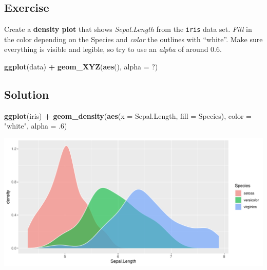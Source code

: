\documentclass[
]{book}
\newenvironment{Shaded}{\begin{snugshade}}{\end{snugshade}}
\newcommand{\AttributeTok}[1]{\textcolor[rgb]{0.13,0.29,0.53}{#1}}
\newcommand{\DecValTok}[1]{\textcolor[rgb]{0.00,0.00,0.81}{#1}}
\newcommand{\FunctionTok}[1]{\textcolor[rgb]{0.13,0.29,0.53}{\textbf{#1}}}
\newcommand{\NormalTok}[1]{#1}
\newcommand{\SpecialCharTok}[1]{\textcolor[rgb]{0.81,0.36,0.00}{\textbf{#1}}}
\newcommand{\StringTok}[1]{\textcolor[rgb]{0.31,0.60,0.02}{#1}}
\begin{document}
\subsection{Exercise}\label{exercise-1}

Create a \textbf{density plot} that shows \emph{Sepal.Length} from the \texttt{iris} data set.
\emph{Fill} in the color depending on the Species and \emph{color} the outlines with ``white''.
Make sure everything is visible and legible, so try to use an \emph{alpha} of around 0.6.

\begin{Shaded}
\begin{Highlighting}[]
\FunctionTok{ggplot}\NormalTok{(data) }\SpecialCharTok{+} 
  \FunctionTok{geom\_XYZ}\NormalTok{(}\FunctionTok{aes}\NormalTok{(), }\AttributeTok{alpha =}\NormalTok{ ?)}
\end{Highlighting}
\end{Shaded}

\subsection{Solution}\label{solution}

\begin{Shaded}
\begin{Highlighting}[]
\FunctionTok{ggplot}\NormalTok{(iris) }\SpecialCharTok{+} 
  \FunctionTok{geom\_density}\NormalTok{(}\FunctionTok{aes}\NormalTok{(}\AttributeTok{x =}\NormalTok{ Sepal.Length, }\AttributeTok{fill =}\NormalTok{ Species), }
               \AttributeTok{color =} \StringTok{"white"}\NormalTok{, }\AttributeTok{alpha =}\NormalTok{ .}\DecValTok{6}\NormalTok{)}
\end{Highlighting}
\end{Shaded}

\begin{flushleft}\includegraphics{_main_files/figure-html/unnamed-chunk-36-1} \end{flushleft}
\end{document}
